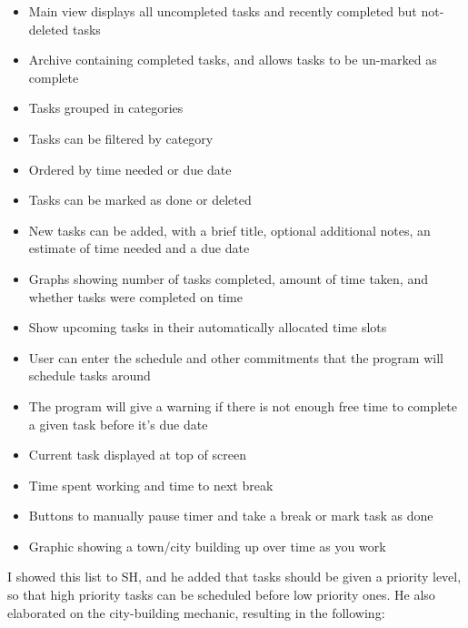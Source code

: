 \documentclass{article}
\begin{document}
\begin{samepage}
	\begin{itemize}
		\item Main view displays all uncompleted tasks and recently completed but
		      not-deleted tasks
		\item Archive containing completed tasks, and allows tasks to be un-marked as
		      complete
		\item Tasks grouped in categories
		\item Tasks can be filtered by category
		\item Ordered by time needed or due date
		\item Tasks can be marked as done or deleted
		\item New tasks can be added, with a brief title, optional additional notes, an
		      estimate of time needed and a due date
		\item Graphs showing number of tasks completed, amount of time taken, and
		      whether tasks were completed on time
		\item Show upcoming tasks in their automatically allocated time slots
		\item User can enter the schedule and other commitments that the program will
		      schedule tasks around
		\item The program will give a warning if there is not enough free time to
		      complete a given task before it's due date
		\item Current task displayed at top of screen
		\item Time spent working and time to next break
		\item Buttons to manually pause timer and take a break or mark task as done
		\item Graphic showing a town/city building up over time as you work
	\end{itemize}
\end{samepage}

I showed this list to SH, and he added that tasks should be given a priority
level, so that high priority tasks can be scheduled before low priority ones. He
also elaborated on the city-building mechanic, resulting in the following:
\end{document}
